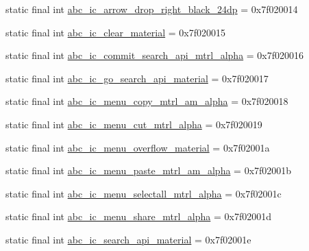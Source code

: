 \begin{CompactItemize}
\item 
static final int \hyperlink{classandroid_1_1support_1_1v7_1_1recyclerview_1_1_r_1_1drawable_f4de8cadfdae91b217556a772887592c}{abc\_\-ic\_\-arrow\_\-drop\_\-right\_\-black\_\-24dp} = 0x7f020014
\item 
static final int \hyperlink{classandroid_1_1support_1_1v7_1_1recyclerview_1_1_r_1_1drawable_66b460a85ec482e3a751a19e1a94345d}{abc\_\-ic\_\-clear\_\-material} = 0x7f020015
\item 
static final int \hyperlink{classandroid_1_1support_1_1v7_1_1recyclerview_1_1_r_1_1drawable_bff38f21790bff62458b8bcaf73d3bd6}{abc\_\-ic\_\-commit\_\-search\_\-api\_\-mtrl\_\-alpha} = 0x7f020016
\item 
static final int \hyperlink{classandroid_1_1support_1_1v7_1_1recyclerview_1_1_r_1_1drawable_962673176205e19bd3f92ce028c5cda5}{abc\_\-ic\_\-go\_\-search\_\-api\_\-material} = 0x7f020017
\item 
static final int \hyperlink{classandroid_1_1support_1_1v7_1_1recyclerview_1_1_r_1_1drawable_bd3054a240426280932cc665e66d8ee0}{abc\_\-ic\_\-menu\_\-copy\_\-mtrl\_\-am\_\-alpha} = 0x7f020018
\item 
static final int \hyperlink{classandroid_1_1support_1_1v7_1_1recyclerview_1_1_r_1_1drawable_25ba92ccd4910819898bf9c3e147b3d5}{abc\_\-ic\_\-menu\_\-cut\_\-mtrl\_\-alpha} = 0x7f020019
\item 
static final int \hyperlink{classandroid_1_1support_1_1v7_1_1recyclerview_1_1_r_1_1drawable_4c40288df73115e23842d1b642d4347b}{abc\_\-ic\_\-menu\_\-overflow\_\-material} = 0x7f02001a
\item 
static final int \hyperlink{classandroid_1_1support_1_1v7_1_1recyclerview_1_1_r_1_1drawable_21bef01c30b755446fc81ef106da6aec}{abc\_\-ic\_\-menu\_\-paste\_\-mtrl\_\-am\_\-alpha} = 0x7f02001b
\item 
static final int \hyperlink{classandroid_1_1support_1_1v7_1_1recyclerview_1_1_r_1_1drawable_2983c09f17680feac49dd51ecc0e4742}{abc\_\-ic\_\-menu\_\-selectall\_\-mtrl\_\-alpha} = 0x7f02001c
\item 
static final int \hyperlink{classandroid_1_1support_1_1v7_1_1recyclerview_1_1_r_1_1drawable_6c47e43bb76aa45cd10568cebefcf558}{abc\_\-ic\_\-menu\_\-share\_\-mtrl\_\-alpha} = 0x7f02001d
\item 
static final int \hyperlink{classandroid_1_1support_1_1v7_1_1recyclerview_1_1_r_1_1drawable_2e5877e2d07925493a786f61c2666a7a}{abc\_\-ic\_\-search\_\-api\_\-material} = 0x7f02001e
\item 

\end{CompactItemize}
